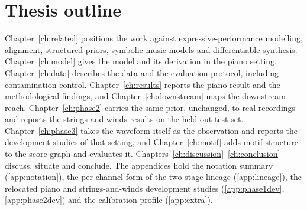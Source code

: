 \section{Thesis outline}
Chapter~\ref{ch:related} positions the work against expressive-performance
modelling, alignment, structured priors, symbolic music models and
differentiable synthesis. Chapter~\ref{ch:model} gives the model and its
derivation in the piano setting. Chapter~\ref{ch:data} describes the data
and the evaluation protocol, including contamination control.
Chapter~\ref{ch:results} reports the piano result and the methodological
findings, and Chapter~\ref{ch:downstream} maps the downstream reach.
Chapter~\ref{ch:phase2} carries the same prior, unchanged, to real
recordings and reports the strings-and-winds results on the held-out test
set. Chapter~\ref{ch:phase3} takes the waveform itself as the observation
and reports the development studies of that setting, and
Chapter~\ref{ch:motif} adds motif structure to the score graph and
evaluates it. Chapters~\ref{ch:discussion}--\ref{ch:conclusion} discuss,
situate and conclude. The appendices hold the notation summary (\ref{app:notation}),
the per-channel form of the two-stage lineage (\ref{app:lineage}), the
relocated piano and strings-and-winds development studies
(\ref{app:phase1dev}, \ref{app:phase2dev}) and the calibration profile
(\ref{app:extra}).

